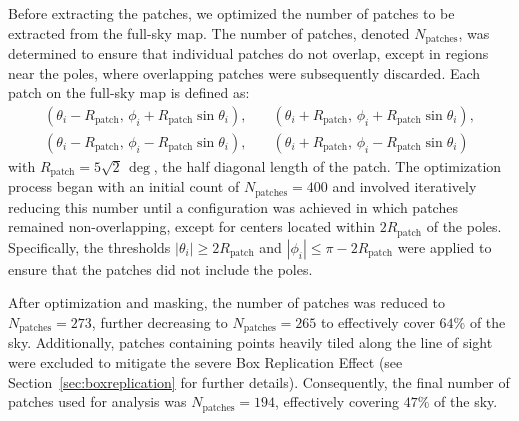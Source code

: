 Before extracting the patches, we optimized the number of patches to be extracted from the full-sky map. The number of patches, denoted \( N_{\text{patches}} \), was determined to ensure that individual patches do not overlap, except in regions near the poles, where overlapping patches were subsequently discarded. Each patch on the full-sky map is defined as:
\begin{align}
    \left( \theta_i - R_{\text{patch}},\, \phi_i + R_{\text{patch}} \sin \theta_i \right),  \quad & \left( \theta_i + R_{\text{patch}},\, \phi_i + R_{\text{patch}} \sin \theta_i \right), \nonumber \\
    \left( \theta_i - R_{\text{patch}},\, \phi_i - R_{\text{patch}} \sin \theta_i \right), \quad &
    \left( \theta_i + R_{\text{patch}},\, \phi_i - R_{\text{patch}} \sin \theta_i \right)
\end{align}
with \( R_{\text{patch}} = 5\sqrt{2}\, \mathrm{\deg} \), the half diagonal length of the patch.
The optimization process began with an initial count of \( N_{\text{patches}} = 400 \) and involved iteratively reducing this number until a configuration was achieved in which patches remained non-overlapping, except for centers located within \( 2R_{\text{patch}}\) of the poles. Specifically, the thresholds $|\theta_i| \geq 2R_{\text{patch}}$ and $|\phi_i| \leq \pi - 2R_{\text{patch}}$ were applied to ensure that the patches did not include the poles.

After optimization and masking, the number of patches was reduced to $N_{\text{patches}} = 273$, further decreasing to $N_{\text{patches}} = 265$ to effectively cover $64 \%$ of the sky. Additionally, patches containing points heavily tiled along the line of sight were excluded to mitigate the severe Box Replication Effect (see Section~\ref{sec:boxreplication} for further details). Consequently, the final number of patches used for analysis was $N_{\text{patches}} = 194$, effectively covering $47 \%$ of the sky.

